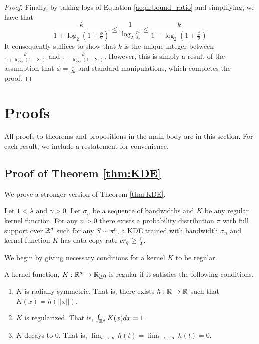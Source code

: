 \begin{proof}
Finally, by taking logs of Equation \ref{aeqn:bound_ratio} and simplifying, we have that 
\begin{equation*}
\frac{k}{1 + \log_2 \left(1 + \frac{\phi}{2}\right)} \leq \frac{1}{\log_2 \frac{r_*}{s_*}} \leq \frac{k}{1 - \log_2 \left(1 + \frac{\phi}{2} \right)}
\end{equation*}
It consequently suffices to show that $k$ is the unique integer between $\frac{k}{1 + \log_2 \left(1 + 8\epsilon\right)}$ and $\frac{k}{1 - \log_2 \left(1 + 2\epsilon\right)}$. However, this is simply a result of the assumption that $\phi = \frac{1}{2k}$ and standard manipulations, which completes the proof. 
\end{proof}

\section{Proofs}

All proofs to theorems and propositions in the main body are in this section. For each result, we include a restatement for convenience. 

\subsection{Proof of Theorem \ref{thm:KDE}}

We prove a stronger version of Theorem \ref{thm:KDE}.

\begin{theorem}
Let $1 < \lambda$ and $\gamma > 0$. Let $\sigma_n$ be a sequence of bandwidths and $K$ be any regular kernel function. For any $n > 0$ there exists a probability distribution $\pi$ with full support over $\mathbb{R}^d$ such for any $S \sim \pi^n$, a KDE trained with bandwidth $\sigma_n$ and kernel function $K$ has data-copy rate $cr_q \geq \frac{1}{2}$.
\end{theorem}

We begin by giving necessary conditions for a kernel $K$ to be regular.

\begin{definition}\label{defn:regular_kernel}
A kernel function, $K: \mathbb{R}^d \to \mathbb{R}_{\geq 0}$ is regular if it satisfies the following conditions.
\begin{enumerate}
	\item $K$ is radially symmetric. That is, there exists $h: \mathbb{R} \to \mathbb{R}$ such that $K(x) = h(||x||)$.
	\item $K$ is regularized. That is, $\int_{\mathbb{R}^d} K(x)dx = 1$.
	\item $K$ decays to $0$. That is, $\lim_{t \to \infty} h(t) = \lim_{t \to -\infty}h(t) = 0$. 
\end{enumerate}
\end{definition}

